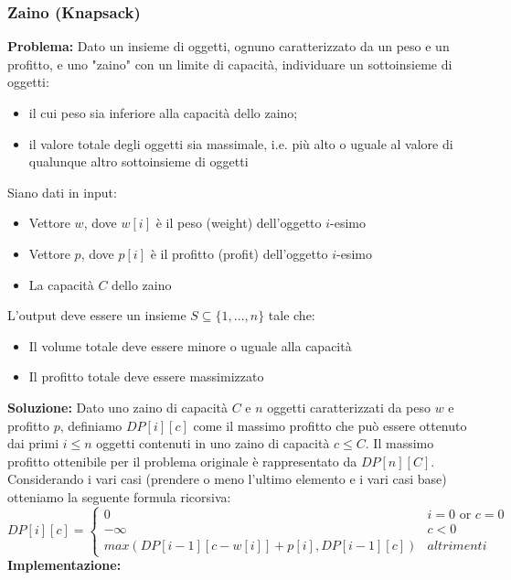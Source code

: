 \documentclass[../cheatSheetAlgoritmi.tex]{subfiles}
\begin{document}
\subsubsection{Zaino (Knapsack)}
\textbf{Problema:} Dato un insieme di oggetti, ognuno caratterizzato da un peso e un
profitto, e uno "zaino" con un limite di capacità, individuare un
sottoinsieme di oggetti: 
\begin{itemize}
	\item il cui peso sia inferiore alla capacità dello zaino;
	\item il valore totale degli oggetti sia massimale, i.e. più alto o uguale al valore di qualunque altro sottoinsieme di oggetti
\end{itemize} 
Siano dati in input: 
\begin{itemize}
	\item Vettore $w$, dove $w[i]$ è il peso (weight) dell’oggetto $i$-esimo
	\item Vettore $p$, dove $p[i]$ è il profitto (profit) dell’oggetto $i$-esimo
	\item La capacità $C$ dello zaino
\end{itemize} 
L'output deve essere un insieme $S  \subseteq \{1, ..., n \}$ tale che:
\begin{itemize}
	\item Il volume totale deve essere minore o uguale alla capacità 
	\item Il profitto totale deve essere massimizzato\\
\end{itemize} 
\textbf{Soluzione:} Dato uno zaino di capacità $C$ e $n$ oggetti caratterizzati da peso $w$ e profitto $p$, definiamo $DP[i][c]$ come il massimo profitto che può essere ottenuto dai primi $i \leq n$ oggetti contenuti in uno zaino di
capacità $c \leq C$. Il massimo profitto ottenibile per il problema originale è rappresentato da $DP[n][C]$.\\
Considerando i vari casi (prendere o meno l'ultimo elemento e i vari casi base) otteniamo la seguente formula ricorsiva: 
\begin{equation*}
  	DP[i][c] =\begin{cases}
    	0 & \text{$i = 0$  or  $c = 0$}\\
    	-\infty & \text{$c < 0$}\\
    	max(DP[i -1][c-w[i]]+p[i], DP[i-1][c]) & \text{$altrimenti$}
  	\end{cases}
\end{equation*}
\newpage
\noindent
\textbf{Implementazione:}
\end{document}
